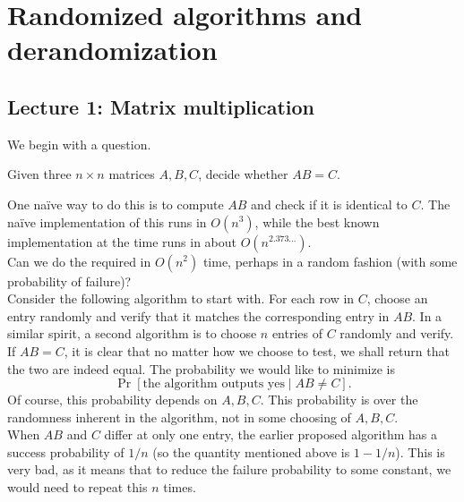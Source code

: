 
\section{Randomized algorithms and derandomization}

	\subsection{Lecture 1: Matrix multiplication}

		We begin with a question.

		\begin{problem*}
			Given three $n\times n$ matrices $A,B,C$, decide whether $AB = C$. 
		\end{problem*}

		One na\"{i}ve way to do this is to compute $AB$ and check if it is identical to $C$. The na\"{i}ve implementation of this runs in $O(n^3)$, while the best known implementation at the time runs in about $O(n^{2.373\ldots})$. \\
		Can we do the required in $O(n^2)$ time, perhaps in a random fashion (with some probability of failure)?\\

		Consider the following algorithm to start with. For each row in $C$, choose an entry randomly and verify that it matches the corresponding entry in $AB$. In a similar spirit, a second algorithm is to choose $n$ entries of $C$ randomly and verify.\\

		If $AB = C$, it is clear that no matter how we choose to test, we shall return that the two are indeed equal. The probability we would like to minimize is
		\[ \Pr[\text{the algorithm outputs yes} \mid AB \ne C]. \]
		Of course, this probability depends on $A,B,C$. This probability is over the randomness inherent in the algorithm, not in some choosing of $A,B,C$. \\

		When $AB$ and $C$ differ at only one entry, the earlier proposed algorithm has a success probability of $1/n$ (so the quantity mentioned above is $1-1/n$). This is very bad, as it means that to reduce the failure probability to some constant, we would need to repeat this $n$ times.\\

